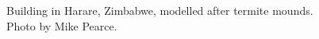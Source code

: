 \documentclass[
  letterpaper,
  DIV=11,
  numbers=noendperiod,
  oneside]{scrreprt}
\begin{document}
\begin{figure}

\begin{minipage}[t]{0.50\linewidth}

{\centering 


\caption{\label{fig-arup_building}Building in Harare, Zimbabwe, modelled
after termite mounds. Photo by Mike Pearce.}

}

\end{minipage}%
%
\begin{minipage}[t]{0.50\linewidth}

{\centering 

}
\end{minipage}
\end{figure}
\end{document}
